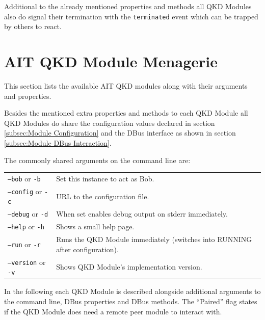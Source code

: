 \medskip

Additional to the already mentioned properties and methods all QKD Modules also do signal their termination with the \texttt{terminated} event which can be trapped by others to react.

\clearpage


\section{AIT QKD Module Menagerie}
\label{sec:AIT QKD Module Menagerie}

This section lists the available AIT QKD modules along with their arguments and properties.

\medskip

Besides the mentioned extra properties and methods to each QKD Module all QKD Modules do share the configuration values declared in section \ref{subsec:Module Configuration} and the DBus interface as shown in section \ref{subsec:Module DBus Interaction}.

\medskip

The commonly shared arguments on the command line are:

\medskip

\begin{tabular}{lp{10cm}}

\texttt{--bob} or \texttt{-b}       & Set this instance to act as Bob. \\ [0.5em]
\texttt{--config} or \texttt{-c}    & URL to the configuration file. \\ [0.5em]
\texttt{--debug} or \texttt{-d}     & When set enables debug output on stderr immediately.\\ [0.5em]
\texttt{--help} or \texttt{-h}      & Shows a small help page. \\ [0.5em]
\texttt{--run} or \texttt{-r}       & Runs the QKD Module immediately (switches into RUNNING after configuration). \\ [0.5em]
\texttt{--version} or \texttt{-v}   & Shows QKD Module's implementation version. \\ [0.5em]

\end{tabular}

In the following each QKD Module is described alongside additional arguments to the command line, DBus properties and DBus methods. The ``Paired'' flag states if the QKD Module does need a remote peer module to interact with.

\clearpage


